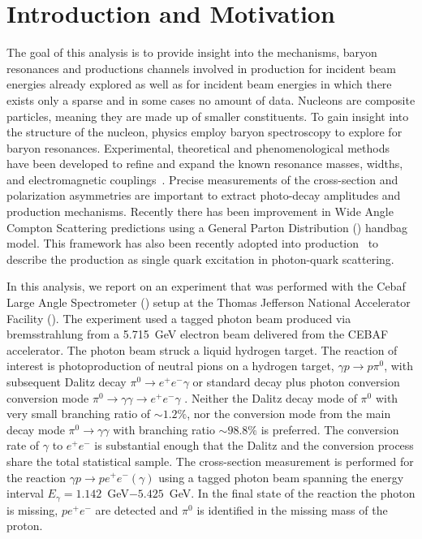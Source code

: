 
\chapter{Introduction and Motivation}\label{sec:intro}
The goal of this analysis is to provide insight into the mechanisms, baryon resonances and productions channels involved in \piz production for incident beam energies already explored as well as for incident beam energies in which there exists only a sparse and in some cases no amount of data.
Nucleons are composite particles, meaning they are made up of smaller constituents. To gain insight into the structure of the nucleon, physics employ baryon spectroscopy to explore for baryon resonances. Experimental, theoretical and phenomenological methods have been developed to refine and expand the known resonance masses, widths, and electromagnetic couplings~\cite{Dugger07}. Precise measurements of the cross-section and polarization asymmetries are important to extract photo-decay amplitudes and production mechanisms. Recently there has been improvement in Wide Angle Compton Scattering predictions using a General Parton Distribution () handbag model. This framework has also been recently adopted into \piz production~\cite{Huang2000} to describe the production as single quark excitation in photon-quark scattering.

In this analysis, we report on an experiment that was performed with the Cebaf Large Angle Spectrometer () setup at the Thomas Jefferson National Accelerator Facility (). The experiment used a tagged photon beam produced via bremsstrahlung from a 5.715~GeV electron beam delivered from the CEBAF accelerator. The photon beam struck a liquid hydrogen target. The reaction of interest is photoproduction of neutral pions on a hydrogen target, $\gamma p\to p\pi^0$, with subsequent Dalitz decay $\pi^0\to e^+e^-\gamma$ or standard decay plus photon conversion conversion mode $\pi^0\to \gamma\gamma\to e^+e^-\gamma$ . Neither the Dalitz decay mode of $\pi^0$ with very small branching ratio of $\sim 1.2\%$, nor the conversion mode from the main decay mode $\pi^0\to \gamma\gamma$ with branching ratio $\sim 98.8\%$ is preferred. The conversion rate of $\gamma$ to $e^+e^-$ is substantial enough that the Dalitz and the conversion process share the total statistical sample. The cross-section measurement is performed for the reaction $\gamma p\to pe^+e^-(\gamma)$ using a tagged photon beam spanning the energy interval  $E_{\gamma}=1.142$~GeV$-5.425$~GeV. In the final state of the reaction the photon is missing, $p e^+e^-$ are detected and $\pi^0$ is identified in the missing mass of the proton.

